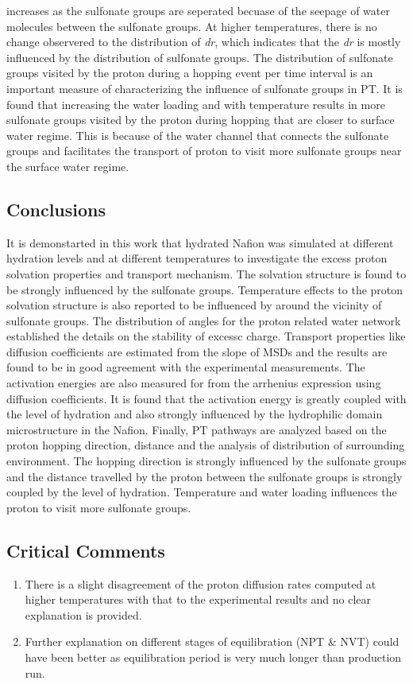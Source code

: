 \documentclass{article}
\begin{document}
increases as the sulfonate groups are seperated becuase of the seepage of water molecules between the sulfonate groups. At higher temperatures, there is no change observered to the distribution of \emph{dr}, which indicates that the \emph{dr} is mostly influenced by the distribution of sulfonate groups. The distribution of sulfonate groups visited by the proton during a hopping event per time interval is an important measure of characterizing the influence of sulfonate groups in PT. It is found that increasing the water loading and with temperature results in more sulfonate groups visited by the proton during hopping that are closer to surface water regime. This is because of the water channel that connects the sulfonate groups and facilitates the transport of proton to visit more sulfonate groups near the surface water regime.

\subsection{Conclusions}
\label{sec-3-4}
It is demonstarted in this work that hydrated Nafion was simulated at different hydration levels and at different temperatures to investigate the excess proton solvation properties and transport mechanism. The solvation structure is found to be strongly influenced by the sulfonate groups. Temperature effects to the proton solvation structure is also reported to be influenced by around the vicinity of sulfonate groups. The distribution of angles for the proton related water network established the details on the stability of excessc charge. Transport properties like diffusion coefficients are estimated from the slope of MSDs and the results are found to be in good agreement with the experimental measurements. The activation energies are also measured for from the arrhenius expression using diffusion coefficients. It is found that the activation energy is greatly coupled with the level of hydration and also strongly influenced by the hydrophilic domain microstructure in the Nafion. Finally, PT pathways are analyzed based on the proton hopping direction, distance and the analysis of distribution of surrounding environment. The hopping direction is strongly influenced by the sulfonate groups and the distance travelled by the proton between the sulfonate groups is strongly coupled by the level of hydration. Temperature and water loading influences the proton to visit more sulfonate groups.

\subsection{Critical Comments}
\label{sec-3-5}
\begin{enumerate}
\item There is a slight disagreement of the proton diffusion rates computed at higher temperatures with that to the experimental results and no clear explanation is provided.
\item Further explanation on different stages of equilibration (NPT \& NVT) could have been better as equilibration period is very much longer than production run.
\end{enumerate}





\end{document}
